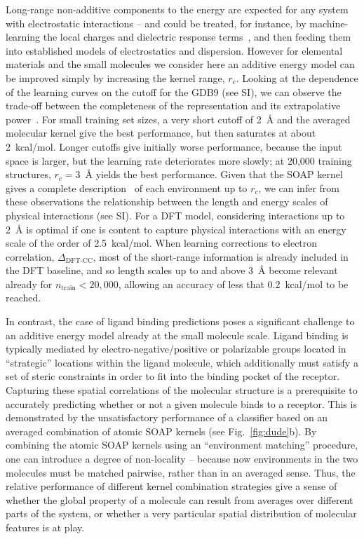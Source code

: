\documentclass[12pt]{article}
\begin{document}
%
Long-range non-additive components to the energy are expected for any system with
electrostatic interactions { -- and could be treated, for instance, by machine-learning the local charges and dielectric response terms~\cite{artr+11prb}, and then feeding them into established models of electrostatics and dispersion. 
}
However for elemental materials and the
small molecules we consider here an additive
energy model can be improved simply by increasing the
kernel range, $r_c$. 
Looking at the dependence
of the learning curves on the cutoff for the GDB9 (see SI),
we can observe the trade-off between the completeness 
of the representation and its extrapolative power~\cite{huan-vonl16jcp}.
For small training set sizes, a very
short cutoff of 2~\AA{} and the averaged
molecular kernel give the best
performance, but then saturates at about 2~kcal/mol.
Longer cutoffs
give initially worse performance,  because
the input space is larger, but
the learning rate deteriorates more slowly;
%
%
at 20,000 training structures,
$r_c=3$~\AA{} yields the best performance. 
Given that the SOAP kernel gives
a complete description~\cite{bart+13prb} of each 
environment up to $r_c$, we can
infer from these observations the 
relationship between the length and energy scales of 
physical interactions (see SI). 
%
%
%
%
%
%
For a DFT model, considering interactions
up to 2~\AA{} is optimal if
one is content to capture physical 
interactions with an energy scale
of the order of 2.5~kcal/mol.
When learning corrections to electron correlation,
$\Delta_\text{DFT-CC}$, most of the
short-range information is already
included in the DFT baseline, and so
length scales up to and above 3~\AA{}
 become relevant already for
 $n_\text{train}<20,000$, allowing an accuracy 
 of less that 0.2~kcal/mol to be reached.

In contrast, the case of ligand binding predictions poses a significant challenge to an
additive energy model already at the small molecule scale.
Ligand binding is typically mediated by electro-negative/positive or 
polarizable groups located in ``strategic'' locations within the ligand 
molecule, which additionally must satisfy a set of steric constraints 
in order to fit into the binding pocket of the receptor. 
Capturing these spatial correlations of the molecular structure is a prerequisite to accurately predicting whether or not a given molecule binds to a receptor. This is demonstrated by the unsatisfactory performance of
a classifier based on an averaged combination
of atomic SOAP kernels (see Fig.~\ref{fig:dude}b).
By combining the atomic SOAP kernels using an ``environment matching'' procedure,
one can introduce a degree of 
non-locality -- because now environments in the
two molecules must be matched pairwise, rather
than in an averaged sense. 
%
%
%
%
%
Thus, the relative performance of different kernel combination strategies
give a sense of whether the global property 
of a molecule can result from averages 
over different parts of the system, or whether
a very particular spatial distribution of 
molecular features is at play.
\end{document}
